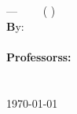 \thispagestyle{empty}


\onecolumn

\noindent
\begin{minipage}[t]{6cm}%
{\footnotesize%
\raisebox{-\height}{{\bfseries \University}} \\
\Location}
\end{minipage}%
\hfill%
\begin{minipage}[b]{10cm}%
\hfill{}
\end{minipage}

\ \\[1.5em]
\phantom{x} \hfill\parbox[t]{50.75 mm}{\flushright \bfseries \School}\\[6 em]
\hfill

\noindent
\parbox{140mm}{\sffamily \bfseries \huge %
\Title%
}\\[.75 em]
{--- \CourseCode~\textbar~\CourseName~\textbar~(\Semester{} \Year)}\\[3 em]


\noindent
{\footnotesize \textbf By:}\\
\AuthorName\\[2em]


\noindent
{\footnotesize \bfseries Professors\ifTwoProfs{}s\fi:}\\
{\footnotesize \FirstProf%
\ifTwoProfs\\\SecondProf\fi}\\[2 em]
\vfill
{\footnotesize \monthyeardate\today}

\restoregeometry